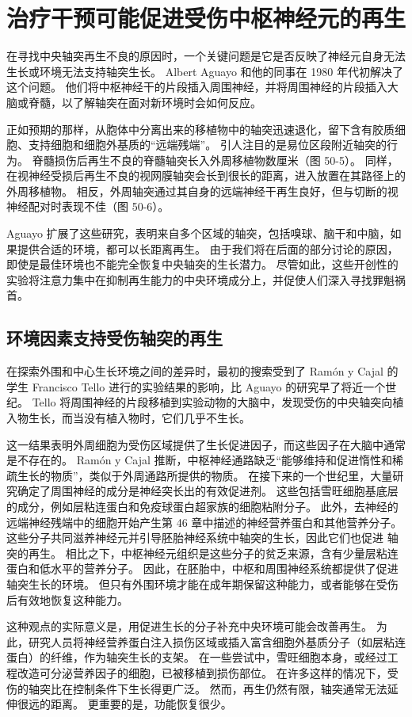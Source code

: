 \section{治疗干预可能促进受伤中枢神经元的再生}
在寻找中央轴突再生不良的原因时，一个关键问题是它是否反映了神经元自身无法生长或环境无法支持轴突生长。 Albert Aguayo 和他的同事在 1980 年代初解决了这个问题。 他们将中枢神经干的片段插入周围神经，并将周围神经的片段插入大脑或脊髓，以了解轴突在面对新环境时会如何反应。

正如预期的那样，从胞体中分离出来的移植物中的轴突迅速退化，留下含有胶质细胞、支持细胞和细胞外基质的“远端残端”。 引人注目的是易位区段附近轴突的行为。 脊髓损伤后再生不良的脊髓轴突长入外周移植物数厘米（图 50-5）。 同样，在视神经受损后再生不良的视网膜轴突会长到很长的距离，进入放置在其路径上的外周移植物。 相反，外周轴突通过其自身的远端神经干再生良好，但与切断的视神经配对时表现不佳（图 50-6）。

Aguayo 扩展了这些研究，表明来自多个区域的轴突，包括嗅球、脑干和中脑，如果提供合适的环境，都可以长距离再生。 由于我们将在后面的部分讨论的原因，即使是最佳环境也不能完全恢复中央轴突的生长潜力。 尽管如此，这些开创性的实验将注意力集中在抑制再生能力的中央环境成分上，并促使人们深入寻找罪魁祸首。

\subsection{环境因素支持受伤轴突的再生}
在探索外围和中心生长环境之间的差异时，最初的搜索受到了 Ramón y Cajal 的学生 Francisco Tello 进行的实验结果的影响，比 Aguayo 的研究早了将近一个世纪。 Tello 将周围神经的片段移植到实验动物的大脑中，发现受伤的中央轴突向植入物生长，而当没有植入物时，它们几乎不生长。

这一结果表明外周细胞为受伤区域提供了生长促进因子，而这些因子在大脑中通常是不存在的。 Ramón y Cajal 推断，中枢神经通路缺乏“能够维持和促进惰性和稀疏生长的物质”，类似于外周通路所提供的物质。 在接下来的一个世纪里，大量研究确定了周围神经的成分是神经突长出的有效促进剂。 这些包括雪旺细胞基底层的成分，例如层粘连蛋白和免疫球蛋白超家族的细胞粘附分子。 此外，去神经的远端神经残端中的细胞开始产生第 46 章中描述的神经营养蛋白和其他营养分子。这些分子共同滋养神经元并引导胚胎神经系统中轴突的生长，因此它们也促进 轴突的再生。 相比之下，中枢神经元组织是这些分子的贫乏来源，含有少量层粘连蛋白和低水平的营养分子。 因此，在胚胎中，中枢和周围神经系统都提供了促进轴突生长的环境。 但只有外围环境才能在成年期保留这种能力，或者能够在受伤后有效地恢复这种能力。

这种观点的实际意义是，用促进生长的分子补充中央环境可能会改善再生。 为此，研究人员将神经营养蛋白注入损伤区域或插入富含细胞外基质分子（如层粘连蛋白）的纤维，作为轴突生长的支架。 在一些尝试中，雪旺细胞本身，或经过工程改造可分泌营养因子的细胞，已被移植到损伤部位。 在许多这样的情况下，受伤的轴突比在控制条件下生长得更广泛。 然而，再生仍然有限，轴突通常无法延伸很远的距离。 更重要的是，功能恢复很少。

